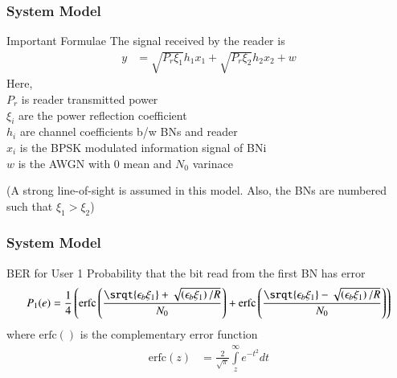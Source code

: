 \documentclass{beamer}
\providecommand{\erfc}[1]{\ensuremath{\text{erfc}\left(#1\right)}}
\newcommand{\Integral}[2]{\ensuremath{\int\limits_{#1}^{#2}}}
\providecommand{\brak}[1]{\ensuremath{\left(#1\right)}}
\theoremstyle{remark}
\numberwithin{equation}{subsection}
\newcommand\tab[1][1cm]{\hspace*{#1}}
\begin{document}
\begin{frame}
\frametitle{System Model}
\begin{block}{Important Formulae}
    The signal received by the reader is
    \begin{align}
        y&=\sqrt{P_r \xi_1}h_1 x_1 + \sqrt{P_r \xi_2}h_2 x_2 + w\nonumber
    \end{align}
    Here,\\
    \tab $P_r$ is reader transmitted power\\
    \tab $\xi_i$ are the power reflection coefficient\\
    \tab $h_i$ are channel coefficients b/w BNs and reader\\
    \tab $x_i$ is the BPSK modulated information signal of BNi\\
    \tab $w$ is the AWGN with 0 mean and $N_0$ varinace
    
    
    (A strong line-of-sight is assumed in this model. Also, the BNs are numbered such that $\xi_1 > \xi_2$)
\end{block}
\end{frame}

\begin{frame}
\frametitle{System Model}
\begin{block}{BER for User 1}
    Probability that the bit read from the first BN has error
    \begin{align}
        P_1(e) = \frac{1}{4}\brak{\erfc{ \frac{\srqt{\epsilon_b \xi_1}+\sqrt{\brak{\epsilon_b \xi_1}/R } }{N_0} } + \erfc{ \frac{\srqt{\epsilon_b \xi_1}-\sqrt{\brak{\epsilon_b \xi_1}/R } }{N_0} }}\nonumber
    \end{align}
    where $\erfc{}$ is the complementary error function
    \begin{align}
        \erfc{z}&=\frac{2}{\sqrt{\pi}}\Integral{z}{\infty}e^{-t^{2}} d t\nonumber
    \end{align}
\end{block}
\end{frame}
\end{document}
